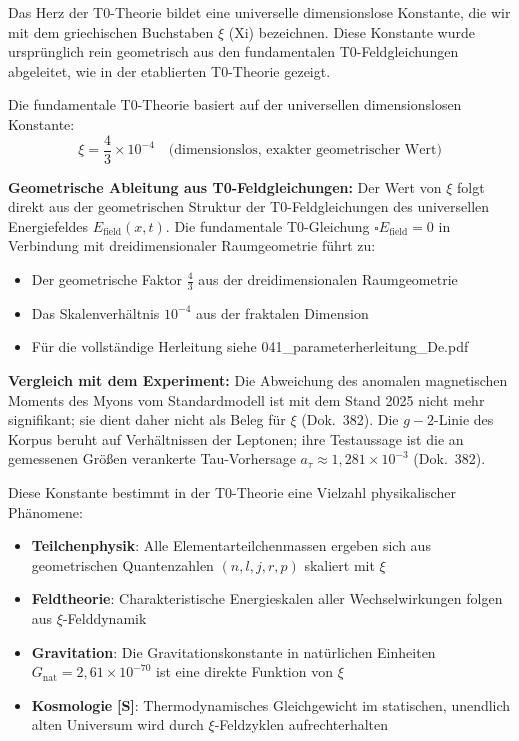 	Das Herz der T0-Theorie bildet eine universelle dimensionslose Konstante, die wir mit dem griechischen Buchstaben $\xi$ (Xi) bezeichnen. Diese Konstante wurde ursprünglich rein geometrisch aus den fundamentalen T0-Feldgleichungen abgeleitet, wie in der etablierten T0-Theorie \cite{T0Theory} gezeigt.
	
	Die fundamentale T0-Theorie basiert auf der universellen dimensionslosen Konstante:
	\begin{equation}
		\xi = \frac{4}{3} \times 10^{-4} \quad \text{(dimensionslos, exakter geometrischer Wert)}
	\end{equation}
	
	\textbf{Geometrische Ableitung aus T0-Feldgleichungen:} Der Wert von $\xi$ folgt direkt aus der geometrischen Struktur der T0-Feldgleichungen des universellen Energiefeldes $E_{\text{field}}(x,t)$. Die fundamentale T0-Gleichung $\square E_{\text{field}} = 0$ in Verbindung mit dreidimensionaler Raumgeometrie führt zu:
\begin{itemize}
	\item Der geometrische Faktor $\frac{4}{3}$ aus der dreidimensionalen Raumgeometrie
	\item Das Skalenverhältnis $10^{-4}$ aus der fraktalen Dimension
	\item Für die vollständige Herleitung siehe 041\_parameterherleitung\_De.pdf 
\end{itemize}
	
	\textbf{Vergleich mit dem Experiment:} Die Abweichung des anomalen magnetischen Moments des Myons vom Standardmodell ist mit dem Stand 2025 nicht mehr signifikant; sie dient daher nicht als Beleg für $\xi$ (Dok.~382). Die $g-2$-Linie des Korpus beruht auf Verhältnissen der Leptonen; ihre Testaussage ist die an gemessenen Größ{}en verankerte Tau-Vorhersage $a_\tau \approx 1{,}281\times10^{-3}$ (Dok.~382).
	
	Diese Konstante bestimmt in der T0-Theorie eine Vielzahl physikalischer Phänomene:
	\begin{itemize}
		\item \textbf{Teilchenphysik}: Alle Elementarteilchenmassen ergeben sich aus geometrischen Quantenzahlen $(n,l,j,r,p)$ skaliert mit $\xi$
		\item \textbf{Feldtheorie}: Charakteristische Energieskalen aller Wechselwirkungen folgen aus $\xi$-Felddynamik
		\item \textbf{Gravitation}: Die Gravitationskonstante in natürlichen Einheiten $G_{\text{nat}} = 2{,}61 \times 10^{-70}$ ist eine direkte Funktion von $\xi$
		\item \textbf{Kosmologie} \textbf{[S]}: Thermodynamisches Gleichgewicht im statischen, unendlich alten Universum wird durch $\xi$-Feldzyklen aufrechterhalten
	\end{itemize}
	
